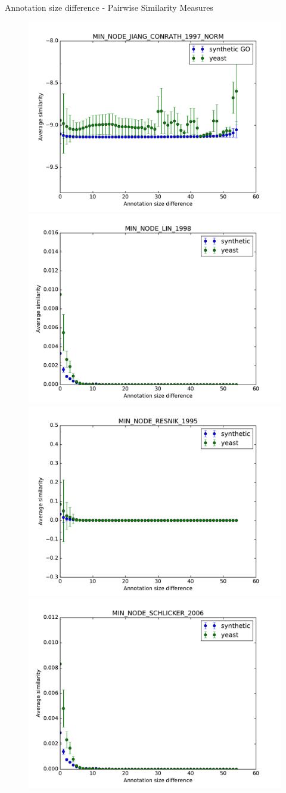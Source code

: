 \documentclass{beamer}
\begin{document}
\begin{frame}{Annotation size difference - Pairwise Similarity Measures}
\begin{figure}
\includegraphics[width=0.5\linewidth, height=0.4\textheight]{pairwise_diff/SIM_GROUPWISE_MIN_SIM_PAIRWISE_DAG_NODE_JIANG_CONRATH_1997_NORM_diff.pdf}
\includegraphics[width=0.5\linewidth, height=0.4\textheight]{pairwise_diff/SIM_GROUPWISE_MIN_SIM_PAIRWISE_DAG_NODE_LIN_1998_diff.pdf} \\
\includegraphics[width=0.5\linewidth, height=0.4\textheight]{pairwise_diff/SIM_GROUPWISE_MIN_SIM_PAIRWISE_DAG_NODE_RESNIK_1995_diff.pdf}
\includegraphics[width=0.5\linewidth, height=0.4\textheight]{pairwise_diff/SIM_GROUPWISE_MIN_SIM_PAIRWISE_DAG_NODE_SCHLICKER_2006_diff.pdf}
\end{figure}
\end{frame}
\end{document}
